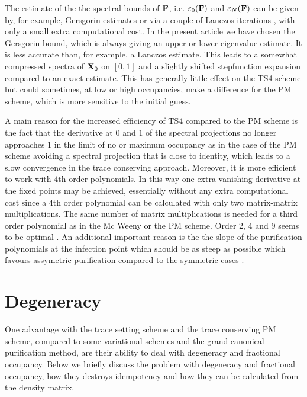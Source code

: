 \commentoutA{\documentclass[prb,aps,twocolumn,twocolumngrid,secnumarabic,superbib,hyperref]{revtex4}}
\begin{document}
The estimate of the the spectral bounds of $\bf F$, i.e. 
$\varepsilon_0({\bf F})$ and $\varepsilon_N({\bf F})$ can be given
by, for example, Gersgorin estimates \cite{Palser98}
or via a couple of Lanczos iterations \cite{Daniels99},
with only a small extra computational cost. In the present
article we have chosen the Gersgorin bound, which is
always giving an upper or lower eigenvalue estimate.
It is less accurate than, for example, a Lanczos
estimate. This leads to a somewhat compressed
spectra of ${\bf X}_0$ on $[0,1]$ and a slightly shifted
stepfunction expansion compared to an exact estimate.
This has generally little effect on the TS4 scheme but
could sometimes, at low or high occupancies, make a difference
for the PM scheme, which is more sensitive to the initial
guess.

A main reason for the increased efficiency of TS4 compared to the PM scheme is 
the fact that the derivative at $0$ and $1$ of the spectral projections 
no longer approaches $1$ in the limit of no or maximum
occupancy as in the case of the PM scheme avoiding a spectral
projection that is close to identity, which leads to a slow
convergence in the trace conserving approach. Moreover, it is more efficient to 
work with 4th order polynomials. In this way one extra vanishing
derivative at the fixed points may be achieved, essentially without any
extra computational cost since a 4th order polynomial can be
calculated with only two matrix-matrix multiplications. The
same number of matrix multiplications is needed for a third
order polynomial as in the Mc Weeny or the PM scheme. 
Order 2, 4 and 9 seems to be optimal \cite{Niklasson02}.
An additional important reason is the the slope of the
purification polynomials at the infection point which should
be as steep as possible which favours assymetric purification 
compared to the symmetric cases \cite{Niklasson02b}.


\section{Degeneracy}\label{Degen}

One advantage with the trace setting scheme and the trace
conserving PM scheme, compared to some variational schemes \cite{Li93}
and the grand canonical purification method,
are their ability to deal with degeneracy and fractional occupancy.
Below we briefly discuss the problem with degeneracy and fractional
occupancy, how they destroys idempotency and how they can be calculated
from the density matrix.
\end{document}
